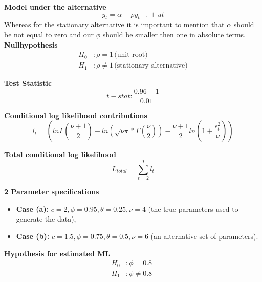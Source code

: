 \documentclass[12pt]{article}
\begin{document}
\textbf{Model under the alternative}
\begin{equation}
    y_t = \alpha + \rho y_{t-1} + ut
    \label{eq:alternative}
\end{equation}
Whereas for the stationary alternative it is important to mention that $\alpha$ should be not equal to zero and our $\phi$ should be smaller then one in absolute terms.\\

\textbf{Nullhypothesis}
\begin{equation}
\begin{aligned}
    H_0 &: \rho = 1 \, \text{(unit root)} \\
    H_1 &: \rho \neq 1 \, \text{(stationary alternative)}
\end{aligned}
\label{eq:dftest}
\end{equation}

\textbf{Test Statistic}
\begin{equation}
    t-stat: \frac{0.96-1}{0.01}
    \label{eq:dftstat2}
\end{equation}

\textbf{Conditional log likelihood contributions}
 \begin{equation}
      l_{t} =  (ln \Gamma(\frac{\nu +1}{2})- ln(\sqrt{\nu \pi} * \Gamma(\frac{\nu}{2})) - \frac{\nu+1}{2}ln(1+\frac{\epsilon_t^{2}}{\nu}))
      \label{eq:clc}
 \end{equation}

\textbf{Total conditional log likelihood}
\begin{equation}
    L_{total} = \sum_{t=2}^{T} l_t
    \label{eq:tcl}
\end{equation}

\textbf{2 Parameter specifications}
\begin{itemize}
    \item \textbf{Case (a):} $c = 2, \phi = 0.95, \theta = 0.25, \nu = 4$ (the true parameters used to generate the data),
    \item \textbf{Case (b):} $c = 1.5, \phi = 0.75, \theta = 0.5, \nu = 6$ (an alternative set of parameters).
    \label{specifica}
\end{itemize}

\textbf{Hypothesis for estimated ML}
\begin{equation}
\begin{aligned}
    H_0 &: \phi = 0.8 \, \ \\
    H_1 &: \phi \neq 0.8 \,
\end{aligned}
\label{eq:nullacht}
\end{equation}
\end{document}
